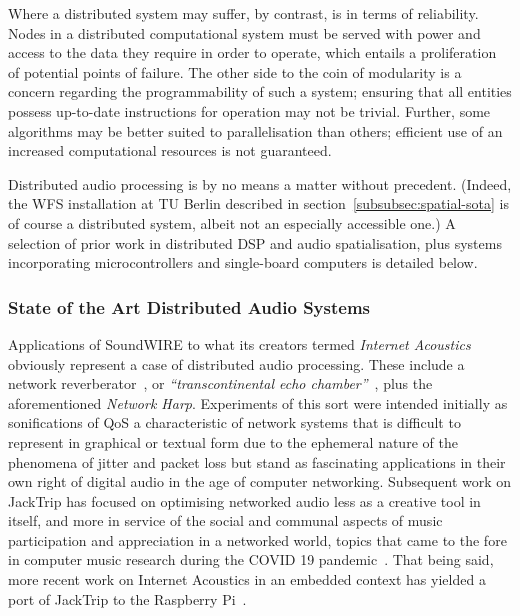 \documentclass[utf8]{FrontiersinHarvard}
\newcommand{\secref}[1]{section~\ref{#1}}
\begin{document}
    Where a distributed system may suffer, by contrast, is in terms of
    reliability.
    Nodes in a distributed computational system must be served with power and
    access to the data they require in order to operate, which entails a
    proliferation of potential points of failure.
    The other side to the coin of modularity is a concern regarding the
    programmability of such a system;
    ensuring that all entities possess up-to-date instructions for operation may
    not be trivial.
    Further, some algorithms may be better suited to parallelisation than
    others; efficient use of an increased computational resources is not
    guaranteed.

    Distributed audio processing is by no means a matter without precedent.
    (Indeed, the WFS installation at TU Berlin described in
    \secref{subsubsec:spatial-sota} is of course a distributed system, albeit
    not an especially accessible one.)
    A selection of prior work in distributed DSP and audio spatialisation, plus
    systems incorporating microcontrollers and single-board computers is
    detailed below.

    \subsubsection{State of the Art Distributed Audio Systems}

    Applications of SoundWIRE to what its creators termed \textit{Internet
    Acoustics}~\citep{chafe_physical_2002} obviously represent a case of
    distributed audio processing.
    These include a network reverberator~\citep{chafe_i_2018}, or
    \textit{``transcontinental echo chamber''}~\citep{chafe_simplified_2000},
    plus the aforementioned \textit{Network Harp}.
    Experiments of this sort were intended initially as sonifications of QoS
    \textemdash{} a characteristic of network systems that is difficult to
    represent in graphical or textual form due to the ephemeral nature of the
    phenomena of jitter and packet loss \textemdash{} but stand as fascinating
    applications in their own right of digital audio in the age of computer
    networking.
    Subsequent work on JackTrip has focused on optimising networked audio less
    as a creative tool in itself, and more in service of the social and communal
    aspects of music participation and appreciation in a networked world, topics
    that came to the fore in computer music research during the
    COVID 19 pandemic~\citep{bosi_experiencing_2021,
        sacchetto_jacktrip-webrtc_2021}.
    That being said, more recent work on Internet Acoustics in an embedded
    context has yielded a port of JackTrip to the Raspberry
    Pi~\citep{chafe_jacktrip_2019}.
\end{document}
